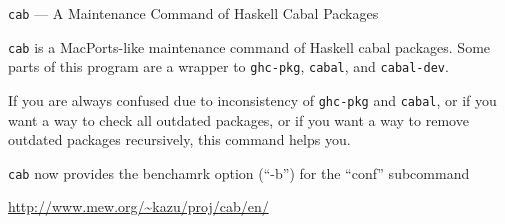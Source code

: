 \begin{hcarentry}[updated]{{\tt cab} --- A Maintenance Command of Haskell Cabal Packages}
\makeheader

{\tt cab} is a MacPorts-like maintenance command of Haskell cabal packages. Some parts of this program are a wrapper to {\tt ghc-pkg}, {\tt cabal}, and {\tt cabal-dev}.

If you are always confused due to inconsistency of {\tt ghc-pkg} and {\tt cabal}, or if you want a way to check all outdated packages, or if you want a way to remove outdated packages recursively, this command helps you.

{\tt cab} now provides the benchamrk option (``-b'') for the ``conf'' subcommand

\FurtherReading
  \url{http://www.mew.org/~kazu/proj/cab/en/}
\end{hcarentry}
